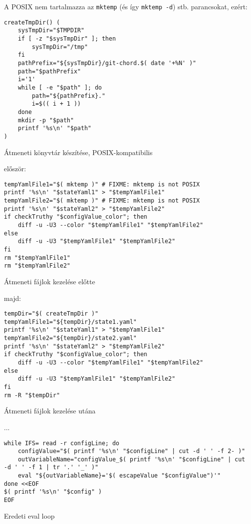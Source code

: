 \documentclass[final]{elteikthesis}[2025/03/25]
\begin{document}
A POSIX nem tartalmazza az \verb|mktemp| (és így \verb|mktemp -d|) stb. parancsokat, ezért:

\begin{listing}[H]
\begin{verbatim}
createTmpDir() (
    sysTmpDir="$TMPDIR"
    if [ -z "$sysTmpDir" ]; then
        sysTmpDir="/tmp"
    fi
    pathPrefix="${sysTmpDir}/git-chord.$( date '+%N' )"
    path="$pathPrefix"
    i='1'
    while [ -e "$path" ]; do
        path="${pathPrefix}."
        i=$(( i + 1 ))
    done
    mkdir -p "$path"
    printf '%s\n' "$path"
)
\end{verbatim}
\caption{Átmeneti könyvtár készítése, POSIX-kompatibilis}
\end{listing}

először:

\begin{listing}[H]
\begin{verbatim}
tempYamlFile1="$( mktemp )" # FIXME: mktemp is not POSIX
printf '%s\n' "$stateYaml1" > "$tempYamlFile1"
tempYamlFile2="$( mktemp )" # FIXME: mktemp is not POSIX
printf '%s\n' "$stateYaml2" > "$tempYamlFile2"
if checkTruthy "$configValue_color"; then
    diff -u -U3 --color "$tempYamlFile1" "$tempYamlFile2"
else
    diff -u -U3 "$tempYamlFile1" "$tempYamlFile2"
fi
rm "$tempYamlFile1"
rm "$tempYamlFile2"
\end{verbatim}
\caption{Átmeneti fájlok kezelése előtte}
\end{listing}

majd:

\begin{listing}[H]
\begin{verbatim}
tempDir="$( createTmpDir )"
tempYamlFile1="${tempDir}/state1.yaml"
printf '%s\n' "$stateYaml1" > "$tempYamlFile1"
tempYamlFile2="${tempDir}/state2.yaml"
printf '%s\n' "$stateYaml2" > "$tempYamlFile2"
if checkTruthy "$configValue_color"; then
    diff -u -U3 --color "$tempYamlFile1" "$tempYamlFile2"
else
    diff -u -U3 "$tempYamlFile1" "$tempYamlFile2"
fi
rm -R "$tempDir"
\end{verbatim}
\caption{Átmeneti fájlok kezelése utána}
\end{listing}

...

\begin{listing}[H]
\begin{verbatim}
while IFS= read -r configLine; do
    configValue="$( printf '%s\n' "$configLine" | cut -d ' ' -f 2- )"
    outVariableName="configValue_$( printf '%s\n' "$configLine" | cut -d ' ' -f 1 | tr '.' '_' )"
    eval "${outVariableName}='$( escapeValue "$configValue")'"
done <<EOF
$( printf '%s\n' "$config" )
EOF
\end{verbatim}
\caption{Eredeti eval loop}
\end{listing}
\end{document}
